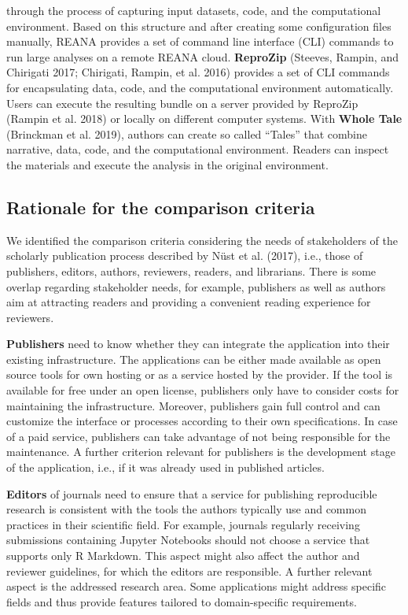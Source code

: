 \documentclass[onecolumn]{article}
\begin{document}
through the process of capturing input datasets, code, and the
computational environment. Based on this structure and after creating
some configuration files manually, REANA provides a set of command line
interface (CLI) commands to run large analyses on a remote REANA cloud.
\textbf{ReproZip} (Steeves, Rampin, and Chirigati 2017; Chirigati,
Rampin, et al. 2016) provides a set of CLI commands for encapsulating
data, code, and the computational environment automatically. Users can
execute the resulting bundle on a server provided by ReproZip (Rampin et
al. 2018) or locally on different computer systems. With \textbf{Whole
Tale} (Brinckman et al. 2019), authors can create so called ``Tales''
that combine narrative, data, code, and the computational environment.
Readers can inspect the materials and execute the analysis in the
original environment.

\hypertarget{rationale-for-the-comparison-criteria}{%
\subsection{Rationale for the comparison
criteria}\label{rationale-for-the-comparison-criteria}}

We identified the comparison criteria considering the needs of
stakeholders of the scholarly publication process described by Nüst et
al. (2017), i.e., those of publishers, editors, authors, reviewers,
readers, and librarians. There is some overlap regarding stakeholder
needs, for example, publishers as well as authors aim at attracting
readers and providing a convenient reading experience for reviewers.

\textbf{Publishers} need to know whether they can integrate the
application into their existing infrastructure. The applications can be
either made available as open source tools for own hosting or as a
service hosted by the provider. If the tool is available for free under
an open license, publishers only have to consider costs for maintaining
the infrastructure. Moreover, publishers gain full control and can
customize the interface or processes according to their own
specifications. In case of a paid service, publishers can take advantage
of not being responsible for the maintenance. A further criterion
relevant for publishers is the development stage of the application,
i.e., if it was already used in published articles.

\textbf{Editors} of journals need to ensure that a service for
publishing reproducible research is consistent with the tools the
authors typically use and common practices in their scientific field.
For example, journals regularly receiving submissions containing Jupyter
Notebooks should not choose a service that supports only R Markdown.
This aspect might also affect the author and reviewer guidelines, for
which the editors are responsible. A further relevant aspect is the
addressed research area. Some applications might address specific fields
and thus provide features tailored to domain-specific requirements.
\end{document}
